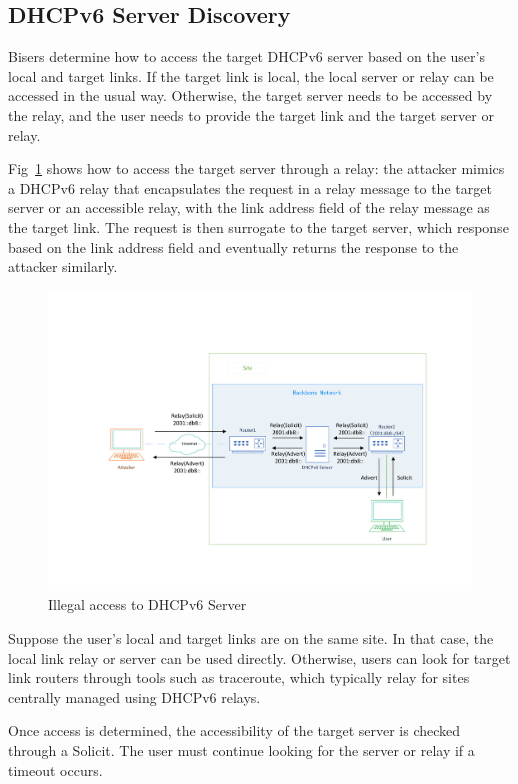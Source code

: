 \documentclass[conference]{IEEEtran}
\begin{document}
\subsection{DHCPv6 Server Discovery}

Bisers determine how to access the target DHCPv6 server based on the
user's local and target links. If the target link is local, the local
server or relay can be accessed in the usual way. Otherwise, the
target server needs to be accessed by the relay, and the user needs to
provide the target link and the target server or relay.

Fig~\ref{figRelay2} shows how to access the target server through a
relay: the attacker mimics a DHCPv6 relay that encapsulates the
request in a relay message to the target server or an accessible
relay, with the link address field of the relay message as the target
link. The request is then surrogate to the target server, which
response based on the link address field and eventually returns the
response to the attacker similarly.

\begin{figure}[htbp]
  \centerline{\includegraphics[scale=0.33]{relay2.pdf}}
  \caption{Illegal access to DHCPv6 Server}
  \label{figRelay2}
\end{figure}

Suppose the user's local and target links are on the same site. In
that case, the local link relay or server can be used
directly. Otherwise, users can look for target link routers through
tools such as traceroute, which typically relay for sites centrally
managed using DHCPv6 relays.

Once access is determined, the accessibility of the target server is
checked through a Solicit. The user must continue looking for the
server or relay if a timeout occurs.
\end{document}
